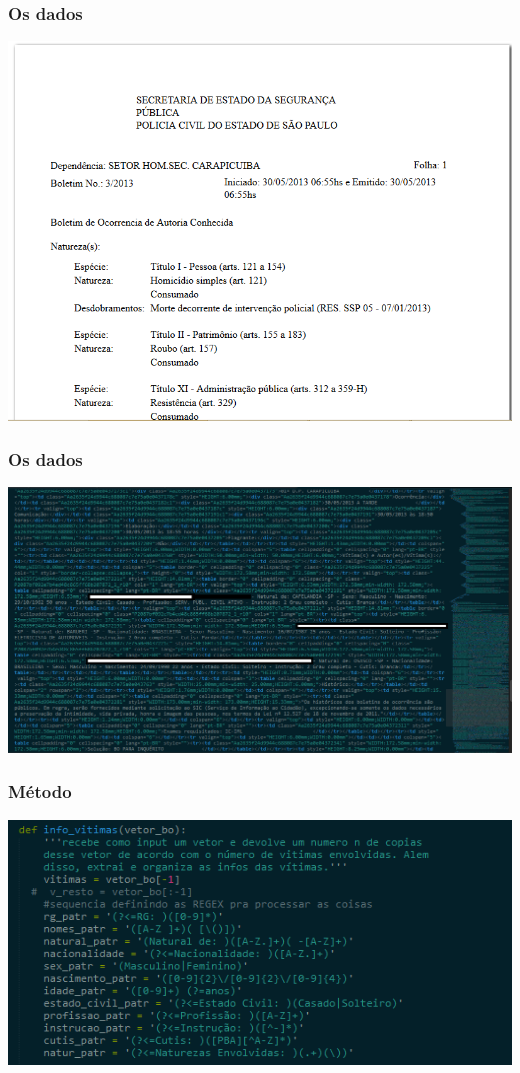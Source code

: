 \documentclass[11pt]{beamer}
\begin{document}
\begin{frame}
\frametitle{Os dados}
\includegraphics[width=\columnwidth,height=\textheight,keepaspectratio]{bo-bonito.png}
\end{frame}
\begin{frame}
\frametitle{Os dados}
\includegraphics[width=\columnwidth,height=\textheight,keepaspectratio]{bo-html.png}
\end{frame}
\begin{frame}
\frametitle{Método}
\includegraphics[width=\columnwidth,height=\textheight,keepaspectratio]{bo-regex.png}
\end{frame}
\end{document}
